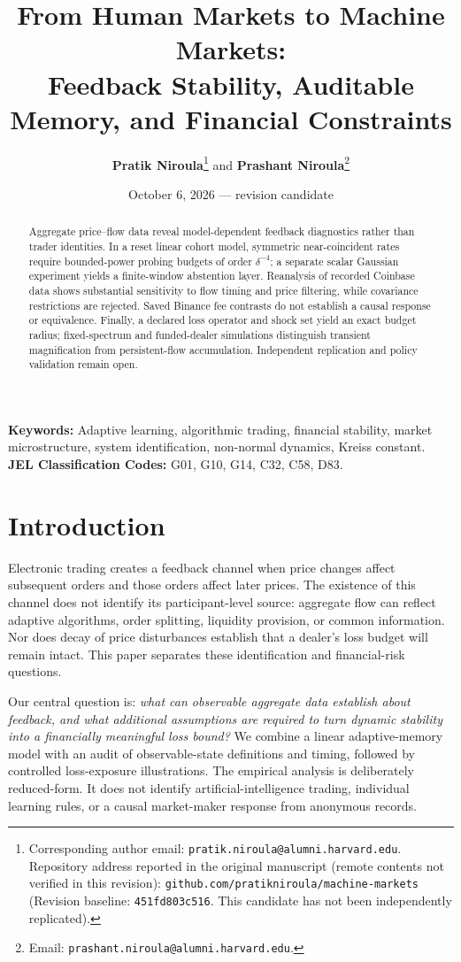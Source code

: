 \documentclass[12pt]{article}
\title{\textbf{From Human Markets to Machine Markets:}\\[0.3em]
\Large Feedback Stability, Auditable Memory, and Financial Constraints}
\author{\textbf{Pratik Niroula}\thanks{Corresponding author email: \texttt{pratik.niroula@alumni.harvard.edu}. Repository address reported in the original manuscript (remote contents not verified in this revision): \texttt{github.com/pratikniroula/machine-markets} (Revision baseline: \texttt{451fd803c516}. This candidate has not been independently replicated).} \quad and \quad \textbf{Prashant Niroula}\thanks{Email: \texttt{prashant.niroula@alumni.harvard.edu}.}}
\date{October 6, 2026 --- revision candidate}
\theoremstyle{definition}
\theoremstyle{remark}
\begin{document}
\hypersetup{pageanchor=false}\maketitle
\thispagestyle{empty}

\vspace{-0.5em}
\begin{abstract}
\noindent Aggregate price--flow data reveal model-dependent feedback diagnostics rather than trader identities. In a reset linear cohort model, symmetric near-coincident rates require bounded-power probing budgets of order $\delta^{-4}$; a separate scalar Gaussian experiment yields a finite-window abstention layer. Reanalysis of recorded Coinbase data shows substantial sensitivity to flow timing and price filtering, while covariance restrictions are rejected. Saved Binance fee contrasts do not establish a causal response or equivalence. Finally, a declared loss operator and shock set yield an exact budget radius; fixed-spectrum and funded-dealer simulations distinguish transient magnification from persistent-flow accumulation. Independent replication and policy validation remain open.
\end{abstract}

\vspace{1.0em}
\noindent\textbf{Keywords:} Adaptive learning, algorithmic trading, financial stability, market microstructure, system identification, non-normal dynamics, Kreiss constant.\\
\textbf{JEL Classification Codes:} G01, G10, G14, C32, C58, D83.

\newpage
\hypersetup{pageanchor=true}\setcounter{page}{1}


\section{Introduction}
\label{sec:intro}
Electronic trading creates a feedback channel when price changes affect subsequent orders and those orders affect later prices. The existence of this channel does not identify its participant-level source: aggregate flow can reflect adaptive algorithms, order splitting, liquidity provision, or common information. Nor does decay of price disturbances establish that a dealer's loss budget will remain intact. This paper separates these identification and financial-risk questions.

Our central question is: \emph{what can observable aggregate data establish about feedback, and what additional assumptions are required to turn dynamic stability into a financially meaningful loss bound?} We combine a linear adaptive-memory model with an audit of observable-state definitions and timing, followed by controlled loss-exposure illustrations. The empirical analysis is deliberately reduced-form. It does not identify artificial-intelligence trading, individual learning rules, or a causal market-maker response from anonymous records.
\end{document}
